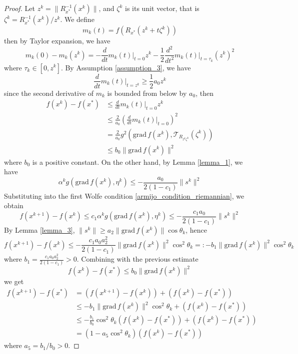 \documentclass[12pt,a4paper,draft]{article}  %
\theoremstyle{definition}
\numberwithin{equation}{section}
\newcommand{\grad}{\mathrm{grad}\,}
\newcommand{\VT}{\mathcal{T}}
\begin{document}
\begin{proof}
        Let $z^k = \|R_{x^\ast}^{-1}(x^k)\|$, and $\zeta^k$ is its unit vector, that is $\zeta^k = R_{x^\ast}^{-1}(x^k)/z^k$. We define
        \[
        m_k(t) = f\left(R_{x^\ast}(z^k + t\zeta^k)\right)
        \]
        then by Taylor expansion, we have
        \begin{equation}
                m_k(0) - m_k(z^k) = -\frac{d}{dt}m_k(t)\Big|_{t=0}z^k - \frac{1}{2}\frac{d^2}{dt^2}m_k(t)\Big|_{t=\tau_k}(z^k)^2
        \end{equation}
        where $\tau_k\in [0,z^k]$. By Assumption \ref{assumption_3}, we have
        \[
        \frac{d}{dt}m_k(t)\Big|_{t=z^k}\geq \frac{1}{2}a_0z^k
        \]
        since the second derivative of $m_k$ is bounded from below by $a_0$, then
        \begin{equation}
                \begin{aligned}
                        f(x^k) - f(x^\ast) &\leq \frac{d}{dt}m_k(t)\Big|_{t=0}z^k\\
                        &\leq \frac{2}{a_0}\left(\frac{d}{dt}m_k(t)\Big|_{t=0}\right)^2\\
                        &= \frac{2}{a_0}g^2\left(\grad f(x^k), \VT_{R_{z^k\zeta^k}}(\zeta^k)\right)\\
                        &\leq b_0\|\grad f(x^k)\|^2
                \end{aligned}
        \end{equation}
        where $b_0$ is a positive constant. On the other hand, by Lemma \ref{lemma_1}, we have
        \[
        \alpha^k g(\grad f(x^k), \eta^k) \leq -\frac{a_0}{2(1-c_1)}\|s^k\|^2
        \]
        Substituting into the first Wolfe condition \eqref{armijo_condition_riemannian}, we obtain
        \[
        f(x^{k+1}) - f(x^k) \leq c_1\alpha^k g(\grad f(x^k), \eta^k) \leq -\frac{c_1 a_0}{2(1-c_1)}\|s^k\|^2
        \]
        By Lemma \ref{lemma_3}, $\|s^k\| \geq a_2\|\grad f(x^k)\|\cos\theta_k$, hence
        \[
        f(x^{k+1}) - f(x^k) \leq -\frac{c_1 a_0 a_2^2}{2(1-c_1)}\|\grad f(x^k)\|^2\cos^2\theta_k =: -b_1\|\grad f(x^k)\|^2\cos^2\theta_k
        \]
        where $b_1 = \frac{c_1 a_0 a_2^2}{2(1-c_1)} > 0$. Combining with the previous estimate $$f(x^k) - f(x^\ast) \leq b_0\|\grad f(x^k)\|^2$$
        we get
        \[
        \begin{aligned}
                f(x^{k+1}) - f(x^\ast) &= \left(f(x^{k+1}) - f(x^k)\right) + \left(f(x^k) - f(x^\ast)\right)\\
                &\leq -b_1\|\grad f(x^k)\|^2\cos^2\theta_k + \left(f(x^k) - f(x^\ast)\right)\\
                &\leq -\frac{b_1}{b_0}\cos^2\theta_k\left(f(x^k) - f(x^\ast)\right) + \left(f(x^k) - f(x^\ast)\right)\\
                &= \left(1 - a_5\cos^2\theta_k\right)\left(f(x^k) - f(x^\ast)\right)
        \end{aligned}
        \]
        where $a_5 = b_1/b_0 > 0$.
\end{proof}
\end{document}

